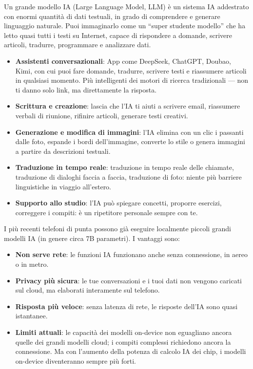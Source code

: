 
Un grande modello IA (Large Language Model, LLM) è un sistema IA addestrato con enormi quantità di dati testuali, in grado di comprendere e generare linguaggio naturale. Puoi immaginarlo come un “super studente modello” che ha letto quasi tutti i testi su Internet, capace di rispondere a domande, scrivere articoli, tradurre, programmare e analizzare dati.


\begin{itemize}
  \item \textbf{Assistenti conversazionali}: App come DeepSeek, ChatGPT, Doubao, Kimi, con cui puoi fare domande, tradurre, scrivere testi e riassumere articoli in qualsiasi momento. Più intelligenti dei motori di ricerca tradizionali — non ti danno solo link, ma direttamente la risposta.
  \item \textbf{Scrittura e creazione}: lascia che l'IA ti aiuti a scrivere email, riassumere verbali di riunione, rifinire articoli, generare testi creativi.
  \item \textbf{Generazione e modifica di immagini}: l'IA elimina con un clic i passanti dalle foto, espande i bordi dell'immagine, converte lo stile o genera immagini a partire da descrizioni testuali.
  \item \textbf{Traduzione in tempo reale}: traduzione in tempo reale delle chiamate, traduzione di dialoghi faccia a faccia, traduzione di foto: niente più barriere linguistiche in viaggio all'estero.
  \item \textbf{Supporto allo studio}: l'IA può spiegare concetti, proporre esercizi, correggere i compiti: è un ripetitore personale sempre con te.
\end{itemize}


I più recenti telefoni di punta possono già eseguire localmente piccoli grandi modelli IA (in genere circa 7B parametri). I vantaggi sono:

\begin{itemize}
  \item \textbf{Non serve rete}: le funzioni IA funzionano anche senza connessione, in aereo o in metro.
  \item \textbf{Privacy più sicura}: le tue conversazioni e i tuoi dati non vengono caricati sul cloud, ma elaborati interamente sul telefono.
  \item \textbf{Risposta più veloce}: senza latenza di rete, le risposte dell'IA sono quasi istantanee.
  \item \textbf{Limiti attuali}: le capacità dei modelli on-device non eguagliano ancora quelle dei grandi modelli cloud; i compiti complessi richiedono ancora la connessione. Ma con l'aumento della potenza di calcolo IA dei chip, i modelli on-device diventeranno sempre più forti.
\end{itemize}

